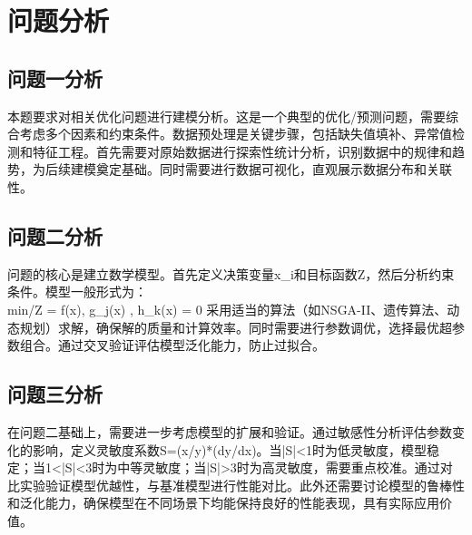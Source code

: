 \newpage
\section{问题分析}

\subsection{问题一分析}
本题要求对相关优化问题进行建模分析。这是一个典型的优化/预测问题，需要综合考虑多个因素和约束条件。数据预处理是关键步骤，包括缺失值填补、异常值检测和特征工程。首先需要对原始数据进行探索性统计分析，识别数据中的规律和趋势，为后续建模奠定基础。同时需要进行数据可视化，直观展示数据分布和关联性。

\subsection{问题二分析}
问题的核心是建立数学模型。首先定义决策变量x_i和目标函数Z，然后分析约束条件。模型一般形式为：
\\min/\max \quad Z = f(x), \quad {} \quad g_j(x) , \; h_k(x) = 0
采用适当的算法（如NSGA-II、遗传算法、动态规划）求解，确保解的质量和计算效率。同时需要进行参数调优，选择最优超参数组合。通过交叉验证评估模型泛化能力，防止过拟合。

\subsection{问题三分析}
在问题二基础上，需要进一步考虑模型的扩展和验证。通过敏感性分析评估参数变化的影响，定义灵敏度系数S=(x/y)*(dy/dx)。当|S|<1时为低灵敏度，模型稳定；当1<|S|<3时为中等灵敏度；当|S|>3时为高灵敏度，需要重点校准。通过对比实验验证模型优越性，与基准模型进行性能对比。此外还需要讨论模型的鲁棒性和泛化能力，确保模型在不同场景下均能保持良好的性能表现，具有实际应用价值。